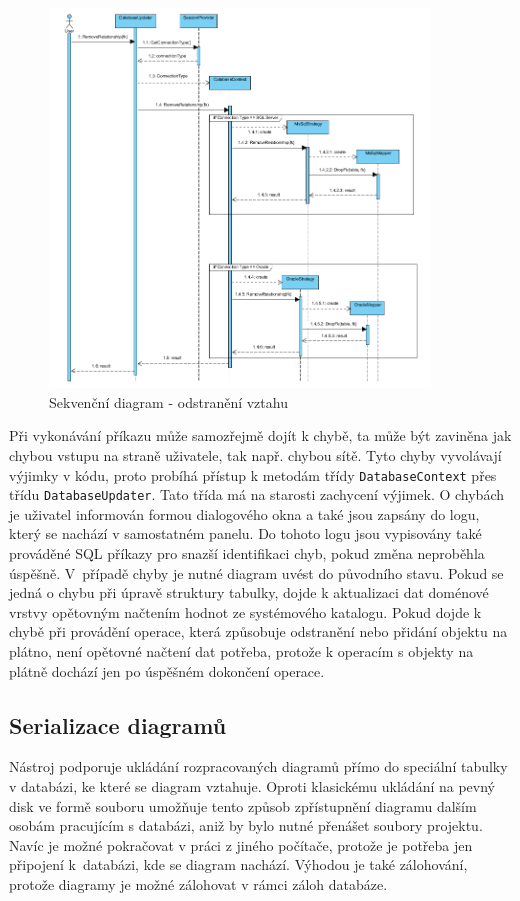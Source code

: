 \documentclass[czech,bachelor,public,dept460,male,oneside]{diploma}
\begin{document}
		\begin{figure}[H]
			\centering
			\includegraphics[width=0.9\textwidth]{Figures/SequenceRemoveFk}
			\caption{Sekvenční diagram - odstranění vztahu}
			\label{fig:seqRemoveFk}
		\end{figure}
		
		Při vykonávání příkazu může samozřejmě dojít k chybě, ta může být zaviněna jak chybou vstupu na straně uživatele, tak např. chybou sítě. Tyto chyby vyvolávají výjimky v kódu, proto probíhá přístup k metodám třídy \texttt{DatabaseContext} přes třídu \texttt{DatabaseUpdater}. Tato třída má na starosti zachycení výjimek. O chybách je uživatel informován formou dialogového okna a také jsou zapsány do logu, který se nachází v samostatném panelu. Do tohoto logu jsou vypisovány také prováděné SQL příkazy pro snazší identifikaci chyb, pokud změna neproběhla úspěšně. V~případě chyby je nutné diagram uvést do původního stavu. Pokud se jedná o chybu při úpravě struktury tabulky, dojde k aktualizaci dat doménové vrstvy opětovným načtením hodnot ze systémového katalogu. Pokud dojde k chybě při provádění operace, která způsobuje odstranění nebo přidání objektu na plátno, není opětovné načtení dat potřeba, protože k operacím s objekty na plátně dochází jen po úspěšném dokončení operace.
	
	\subsection{Serializace diagramů}
	Nástroj podporuje ukládání rozpracovaných diagramů přímo do speciální tabulky v databázi, ke které se diagram vztahuje. Oproti klasickému ukládání na pevný disk ve formě souboru umožňuje tento způsob zpřístupnění diagramu dalším osobám pracujícím s databázi, aniž by bylo nutné přenášet soubory projektu. Navíc je možné pokračovat v práci z jiného počítače, protože je potřeba jen připojení k~databázi, kde se diagram nachází. Výhodou je také zálohování, protože diagramy je možné zálohovat v rámci záloh databáze.
		
\end{document}
